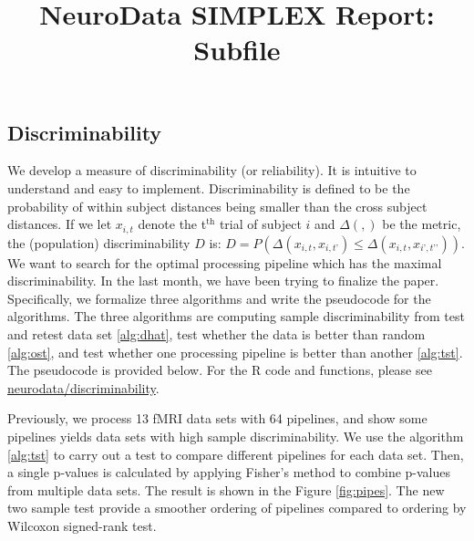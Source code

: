 \documentclass[simplex.tex]{subfiles}
\title{NeuroData SIMPLEX Report: Subfile}
\begin{document}

\subsection{Discriminability}

We develop a measure of discriminability (or reliability).  It
is intuitive to understand and easy to implement.
Discriminability is defined to be the probability of within
subject distances being smaller than the cross subject
distances. If we let $x_{i,t}$ denote the t$^{\text{th}}$ trial of subject 
$i$ and $\Delta(,)$ be the metric, the (population) discriminability $D$
is: $D= P (\Delta(x_{i,t} , x_{i,t’}) \leq  \Delta(x_{i,t} , x_{i’,t’’}))$.
We want to search for the optimal processing pipeline which has the
maximal discriminability. In the last month, we have been trying to finalize the paper. Specifically, we formalize three algorithms and write the pseudocode for the algorithms. The three algorithms are computing sample discriminability from test and retest data set \ref{alg:dhat}, test whether the data is better than random \ref{alg:ost}, and test whether one processing pipeline is better than another \ref{alg:tst}. The pseudocode is provided below. For the R code and functions, please see \href{http://https://github.com/neurodata/discriminability}{neurodata/discriminability}.


Previously, we process 13 fMRI data sets with 64 pipelines, and show some pipelines yields data
sets with high sample discriminability. We use the algorithm \ref{alg:tst} to carry out a test to compare different pipelines for each data set. Then, a single p-values is calculated by applying Fisher's method to combine p-values from multiple data sets. The result is shown in the Figure \ref{fig:pipes}. The new two sample test provide a smoother ordering of pipelines compared to ordering by Wilcoxon signed-rank test.
\end{document}
